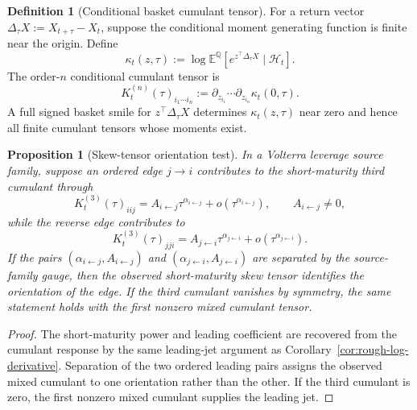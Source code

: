 \documentclass[11pt,a4paper]{amsart}
\theoremstyle{plain}
\newtheorem{proposition}[theorem]{Proposition}
\theoremstyle{definition}
\newtheorem{definition}[theorem]{Definition}
\theoremstyle{remark}
\newcommand{\QQ}{\mathbb{Q}}
\newcommand{\EE}{\mathbb{E}}
\newcommand{\cH}{\mathcal{H}}
\begin{document}
\begin{definition}[Conditional basket cumulant tensor]\label{def:basket-cumulant-tensor}
For a return vector \(\Delta_\tau X:=X_{t+\tau}-X_t\), suppose the conditional moment generating
function is finite near the origin.  Define
\[
        \kappa_t(z,\tau)
        :=
        \log\EE^\QQ[e^{z^\top\Delta_\tau X}\mid\cH_t].
\]
The order-\(n\) conditional cumulant tensor is
\[
        K_t^{(n)}(\tau)_{i_1\cdots i_n}
        :=
        \partial_{z_{i_1}}\cdots\partial_{z_{i_n}}\kappa_t(0,\tau).
\]
A full signed basket smile for \(z^\top\Delta_\tau X\) determines \(\kappa_t(z,\tau)\) near
zero and hence all finite cumulant tensors whose moments exist.
\end{definition}

\begin{proposition}[Skew-tensor orientation test]\label{prop:skew-tensor-orientation}
In a Volterra leverage source family, suppose an ordered edge \(j\to i\) contributes to the
short-maturity third cumulant through
\[
        K_t^{(3)}(\tau)_{iij}
        =
        A_{i\leftarrow j}\tau^{\alpha_{i\leftarrow j}}
        +
        o(\tau^{\alpha_{i\leftarrow j}}),
        \qquad A_{i\leftarrow j}\ne0,
\]
while the reverse edge contributes to
\[
        K_t^{(3)}(\tau)_{jji}
        =
        A_{j\leftarrow i}\tau^{\alpha_{j\leftarrow i}}
        +
        o(\tau^{\alpha_{j\leftarrow i}}).
\]
If the pairs \((\alpha_{i\leftarrow j},A_{i\leftarrow j})\) and
\((\alpha_{j\leftarrow i},A_{j\leftarrow i})\) are separated by the source-family gauge, then
the observed short-maturity skew tensor identifies the orientation of the edge.  If the third
cumulant vanishes by symmetry, the same statement holds with the first nonzero mixed cumulant
tensor.
\end{proposition}

\begin{proof}
The short-maturity power and leading coefficient are recovered from the cumulant response by the
same leading-jet argument as Corollary~\ref{cor:rough-log-derivative}.  Separation of the two
ordered leading pairs assigns the observed mixed cumulant to one orientation rather than the
other.  If the third cumulant is zero, the first nonzero mixed cumulant supplies the leading jet.
\end{proof}
\end{document}
